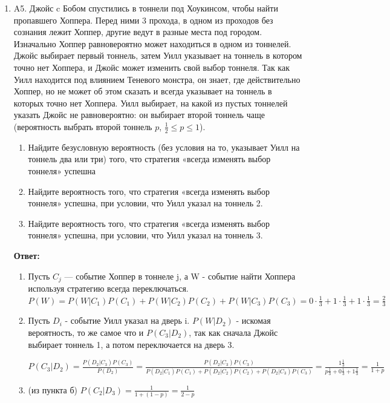 \documentclass[12pt]{article}
\newenvironment{problem}{}{}
\newenvironment{sol}{}{} %
\begin{document}
\begin{enumerate}
\begin{problem}
\item[A5.] Джойс c Бобом спустились в тоннели под Хоукинсом, чтобы найти пропавшего Хоппера. Перед ними 3 прохода, в одном из проходов без сознания лежит Хоппер, другие ведут в разные места под городом. Изначально Хоппер равновероятно может находиться в одном из тоннелей. Джойс выбирает первый тоннель, затем Уилл указывает на тоннель в котором точно нет Хоппера, и Джойс может изменить свой выбор тоннеля. Так как Уилл находится под влиянием Теневого монстра, он знает, где действительно Хоппер, но не может об этом сказать и всегда указывает на тоннель в которых точно нет Хоппера. Уилл выбирает, на какой из пустых тоннелей указать Джойс не равновероятно: он выбирает второй  тоннель чаще (вероятность выбрать второй тоннель  $p$, $\frac{1}{2} \leq p \leq 1$). 

\begin{enumerate}
\item Найдите безусловную вероятность (без условия на то, указывает Уилл на тоннель два или три) того, что стратегия «всегда изменять выбор тоннеля» успешна
\item Найдите вероятность того, что стратегия «всегда изменять выбор тоннеля» успешна, при условии, что Уилл указал на тоннель 2.
\item Найдите вероятность того, что стратегия «всегда изменять выбор тоннеля» успешна, при условии, что Уилл указал на тоннель 3.
\end{enumerate}

\begin{sol}
\textbf{Ответ:} 
\begin{enumerate}
\item Пусть $C_{j}$ — событие Хоппер в тоннеле j, а W - событие найти Хоппера используя стратегию всегда переключаться. 
$P(W) = P(W|C_1)P(C_1)+P(W|C_2)P(C_2)+P(W|C_3)P(C_3) = 0\cdot\frac{1}{3}+1\cdot\frac{1}{3}+1\cdot\frac{1}{3} = \frac{2}{3}$
\item Пусть $D_i$ - событие Уилл указал на дверь i. $P(W|D_2) $ - искомая вероятность, то же самое что и $P(C_3|D_2)$, так как сначала Джойс выбирает тоннель 1, а потом переключается на дверь 3. 

$P(C_3|D_2) = \frac{P(D_2|C_3)P(C_3)}{P(D_2)}=\frac{P(D_2|C_3)P(C_3)}{
P(D_2|C_1)P(C_1) + P(D_2|C_2)P(C_2) + P(D_2|C_3)P(C_3)} = \frac{1\frac{1}{3}}{p\frac{1}{3}+0\frac{1}{3}+1\frac{1}{3}} = \frac{1}{1+p}$
\item (из пункта б) $P(C_2|D_3) = \frac{1}{1+(1-p)}=\frac{1}{2-p}$
\end{enumerate}
\end{sol}
\end{problem}
\end{enumerate}
\end{document}
